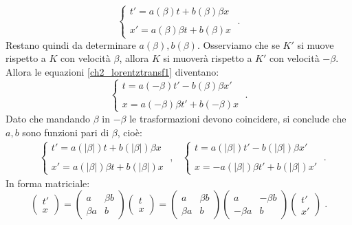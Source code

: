 \begin{equation}
\begin{cases}
t' = a(\beta)t+b(\beta)\beta x \\
\\
x'=a(\beta)\beta t+b(\beta)x
\end{cases}\;. \label{ch2_lorentztransf1}
\end{equation}
Restano quindi da determinare $a(\beta),b(\beta)$. Osserviamo che se $K'$ si muove rispetto a $K$ con velocità $\beta$, allora $K$ si 
muoverà rispetto a $K'$ con velocità $-\beta$. Allora le equazioni \eqref{ch2_lorentztransf1} diventano:
\begin{equation}
\begin{cases}
t = a(-\beta)t'-b(\beta)\beta x' \\
\\
x = a(-\beta)\beta t'+b(-\beta)x
\end{cases}\;.
\end{equation}
Dato che mandando $\beta$ in $-\beta$ le trasformazioni devono coincidere, si conclude che $a,b$ sono funzioni pari di $\beta$, cioè:
\begin{align}
& \begin{cases}
  t'=a(|\beta|)t+b(|\beta|)\beta x \\
\\
x'=a(|\beta|)\beta t+b(|\beta|)x
 \end{cases}\;,
&\begin{cases}
 t=a(|\beta|)t'-b(|\beta|)\beta x' \\
\\
x=-a(|\beta|)\beta t'+b(|\beta|)x'
\end{cases}\;.
\end{align}
In forma matriciale:
\begin{equation}
\begin{pmatrix}
t' \\
x
\end{pmatrix}=\begin{pmatrix}
a & \beta b \\
\beta a & b
\end{pmatrix}\begin{pmatrix}
t \\
x
\end{pmatrix} = \begin{pmatrix}
a & \beta b \\
\beta a & b
\end{pmatrix}\begin{pmatrix}
a & -\beta b \\
-\beta a & b
\end{pmatrix}\begin{pmatrix}
t' \\
x'
\end{pmatrix}\;.
\end{equation}
